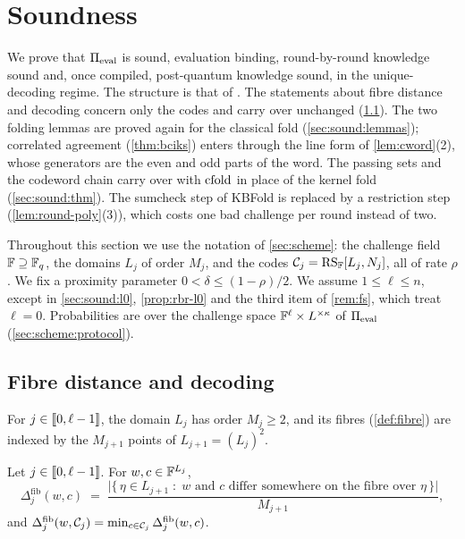 \section{Soundness}\label{sec:sound}

We prove that $\Pi_{\mathrm{eval}}$ is sound, evaluation binding, round-by-round knowledge sound and, once compiled, post-quantum knowledge sound, in the unique-decoding regime.
The structure is that of .
The statements about fibre distance and decoding concern only the codes and carry over unchanged (\cref{sec:sound:fibre}).
The two folding lemmas are proved again for the classical fold (\cref{sec:sound:lemmas}); correlated agreement (\cref{thm:bciks}) enters through the line form of \cref{lem:cword}(2), whose generators are the even and odd parts of the word.
The passing sets and the codeword chain carry over with $\mathrm{cfold}$ in place of the kernel fold (\cref{sec:sound:thm}).
The sumcheck step of KBFold is replaced by a restriction step (\cref{lem:round-poly}(3)), which costs one bad challenge per round instead of two.

Throughout this section we use the notation of \cref{sec:scheme}: the challenge field $\mathbb{F} \supseteq \mathbb{F}_q$, the domains $L_j$ of order $M_j$, and the codes $\mathcal{C}_j = \mathrm{RS}_{\mathbb{F}}[L_j, N_j]$, all of rate $\rho$.
We fix a proximity parameter $0 < \delta \le (1-\rho)/2$.
We assume $1 \le \ell \le n$, except in \cref{sec:sound:l0}, \cref{prop:rbr-l0} and the third item of \cref{rem:fs}, which treat $\ell = 0$.
Probabilities are over the challenge space $\mathbb{F}^\ell \times L^{\times\kappa}$ of $\Pi_{\mathrm{eval}}$ (\cref{sec:scheme:protocol}).

\subsection{Fibre distance and decoding}\label{sec:sound:fibre}

For $j \in \llbracket 0, \ell-1 \rrbracket$, the domain $L_j$ has order $M_j \ge 2$, and its fibres (\cref{def:fibre}) are indexed by the $M_{j+1}$ points of $L_{j+1} = (L_j)^2$.

\begin{definition}\label{def:fibre-dist}
Let $j \in \llbracket 0, \ell-1 \rrbracket$. For $w, c \in \mathbb{F}^{L_j}$,
\[
  \Delta^{\mathrm{fib}}_j(w,c) \;=\; \frac{\bigl|\{\, \eta \in L_{j+1} \;:\; w \text{ and } c \text{ differ somewhere on the fibre over } \eta \,\}\bigr|}{M_{j+1}},
\]
and $\Delta^{\mathrm{fib}}_j(w, \mathcal{C}_j) = \min_{c \in \mathcal{C}_j} \Delta^{\mathrm{fib}}_j(w,c)$.
\end{definition}

